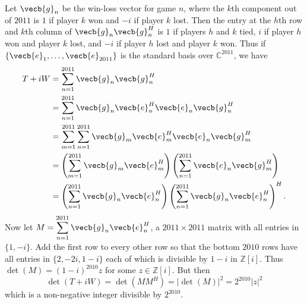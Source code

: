 Let $\vecb{g}_n$ be the win-loss vector for game $n$, where the $k$th component out of $2011$ is $1$ if player $k$ won and $-i$ if player $k$ lost. Then the entry at the $h$th row and $k$th column of $\vecb{g}_n\vecb{g}_n^H$ is $1$ if players $h$ and $k$ tied, $i$ if player $h$ won and player $k$ lost, and $-i$ if player $h$ lost and player $k$ won. Thus if $\{\vecb{e}_1,\ldots,\vecb{e}_{2011}\}$ is the standard basis over $\mathbb{C}^{2011}$, we have
\begin{align*}
	T+iW &= \sum_{n=1}^{2011} \vecb{g}_n\vecb{g}_n^H \\
	&= \sum_{n=1}^{2011} \vecb{g}_n\vecb{e}_n^H\vecb{e}_n\vecb{g}_n^H \\
	&= \sum_{m=1}^{2011} \sum_{n=1}^{2011} \vecb{g}_m\vecb{e}_m^H\vecb{e}_n\vecb{g}_m^H \\
	&= \left( \sum_{m=1}^{2011} \vecb{g}_m\vecb{e}_m^H \right)\left( \sum_{n=1}^{2011} \vecb{e}_n\vecb{g}_m^H \right) \\
	&= \left( \sum_{n=1}^{2011} \vecb{g}_n\vecb{e}_n^H \right)\left( \sum_{n=1}^{2011} \vecb{g}_n\vecb{e}_n^H \right)^H.
\end{align*}
Now let $M=\displaystyle\sum_{n=1}^{2011} \vecb{g}_n\vecb{e}_n^H$, a $2011\times2011$ matrix with all entries in $\{1,-i\}$. Add the first row to every other row so that the bottom $2010$ rows have all entries in $\{2,-2i,1-i\}$ each of which is divisible by $1-i$ in $\mathbb{Z}[i]$. Thus $\det(M)=(1-i)^{2010}z$ for some $z\in\mathbb{Z}[i]$. But then
\[
	\det(T+iW) = \det(MM^H) = |\det(M)|^2 = 2^{2010}|z|^2
\]
which is a non-negative integer divisible by $2^{2010}$.